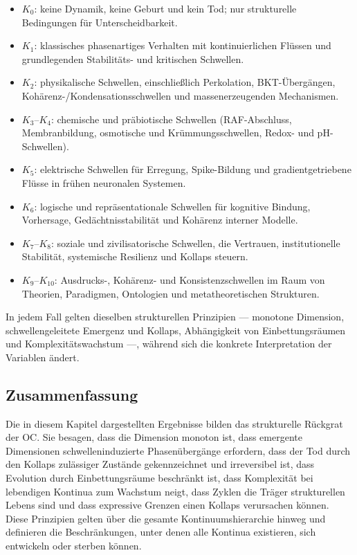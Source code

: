 \begin{itemize}
    \item \(K_0\): keine Dynamik, keine Geburt und kein Tod; nur strukturelle Bedingungen für Unterscheidbarkeit.
    \item \(K_1\): klassisches phasenartiges Verhalten mit kontinuierlichen Flüssen und grundlegenden Stabilitäts- und kritischen Schwellen.
    \item \(K_2\): physikalische Schwellen, einschließlich Perkolation, BKT-Übergängen, Kohärenz-/Kondensationsschwellen und massenerzeugenden Mechanismen.
    \item \(K_3\)–\(K_4\): chemische und präbiotische Schwellen (RAF-Abschluss, Membranbildung, osmotische und Krümmungsschwellen, Redox- und pH-Schwellen).
    \item \(K_5\): elektrische Schwellen für Erregung, Spike-Bildung und gradientgetriebene Flüsse in frühen neuronalen Systemen.
    \item \(K_6\): logische und repräsentationale Schwellen für kognitive Bindung, Vorhersage, Gedächtnisstabilität und Kohärenz interner Modelle.
    \item \(K_7\)–\(K_8\): soziale und zivilisatorische Schwellen, die Vertrauen, institutionelle Stabilität, systemische Resilienz und Kollaps steuern.
    \item \(K_9\)–\(K_{10}\): Ausdrucks-, Kohärenz- und Konsistenzschwellen im Raum von Theorien, Paradigmen, Ontologien und metatheoretischen Strukturen.
\end{itemize}

In jedem Fall gelten dieselben strukturellen Prinzipien --- monotone Dimension, schwellengeleitete Emergenz und Kollaps, Abhängigkeit von Einbettungsräumen und Komplexitätswachstum ---, während sich die konkrete Interpretation der Variablen ändert.

\subsection{Zusammenfassung}

Die in diesem Kapitel dargestellten Ergebnisse bilden das strukturelle Rückgrat der OC.
Sie besagen, dass die Dimension monoton ist, dass emergente Dimensionen schwelleninduzierte Phasenübergänge erfordern, dass der Tod durch den Kollaps zulässiger Zustände gekennzeichnet und irreversibel ist, dass Evolution durch Einbettungsräume beschränkt ist, dass Komplexität bei lebendigen Kontinua zum Wachstum neigt, dass Zyklen die Träger strukturellen Lebens sind und dass expressive Grenzen einen Kollaps verursachen können.
Diese Prinzipien gelten über die gesamte Kontinuumshierarchie hinweg und definieren die Beschränkungen, unter denen alle Kontinua existieren, sich entwickeln oder sterben können.
